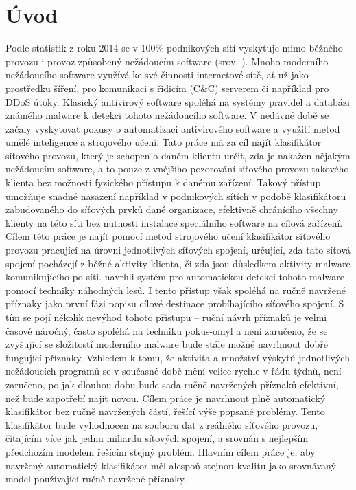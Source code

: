 \chapter*{Úvod}

Podle statistik z roku 2014 se v 100\% podnikových sítí vyskytuje mimo běžného provozu i provoz způsobený nežádoucím software (srov. \cite{_cisco_2014}). Mnoho moderního nežádoucího software využívá ke své činnosti internetové sítě, ať už jako prostředku šíření, pro komunikaci s řidicím (C\&C) serverem či například pro DDoS útoky. Klasický antivirový software spoléhá na systémy pravidel a databázi známého malware k detekci tohoto nežádoucího software. V nedávné době se začaly vyskytovat pokusy o automatizaci antivirového software a využití metod umělé inteligence a strojového učení. Tato práce má za cíl najít klasifikátor síťového provozu, který je schopen o daném klientu určit, zda je nakažen nějakým nežádoucím software, a to pouze z vnějšího pozorování síťového provozu takového klienta bez možnosti fyzického přístupu k danému zařízení. Takový přístup umožňuje snadné nasazení například v podnikových sítích v podobě klasifikátoru zabudovaného do síťových prvků dané organizace, efektivně chránícího všechny klienty na této síti bez nutnosti instalace speciálního software na cílová zařízení. Cílem této práce je najít pomocí metod strojového učení klasifikátor síťového provozu pracující na úrovni jednotlivých síťových spojení, určující, zda tato síťová spojení pocházejí z běžné aktivity klienta, či zda jsou důsledkem aktivity malware komunikujícího po síti. \cite{machlica_learning_2017} navrhli systém pro automatickou detekci tohoto malware pomocí techniky náhodných lesů. I tento přístup však spoléhá na ručně navržené příznaky jako první fázi popisu cílové destinace probíhajícího síťového spojení. S tím se pojí několik nevýhod tohoto přístupu -- ruční návrh příznaků je velmi časově náročný, často spoléhá na techniku pokus-omyl a není zaručeno, že se zvyšující se složitostí moderního malware bude stále možné navrhnout dobře fungující příznaky. Vzhledem k tomu, že aktivita a množství výskytů jednotlivých nežádoucích programů se v současné době mění velice rychle v řádu týdnů, není zaručeno, po jak dlouhou dobu bude sada ručně navržených příznaků efektivní, než bude zapotřebí najít novou. Cílem práce je navrhnout plně automatický klasifikátor bez ručně navržených částí, řešící výše popsané problémy. Tento klasifikátor bude vyhodnocen na souboru dat z reálného síťového provozu, čítajícím více jak jednu miliardu síťových spojení, a srovnán s nejlepším předchozím modelem řešícím stejný problém. Hlavním cílem práce je, aby navržený automatický klasifikátor měl alespoň stejnou kvalitu jako srovnávaný model používající ručně navržené příznaky.

